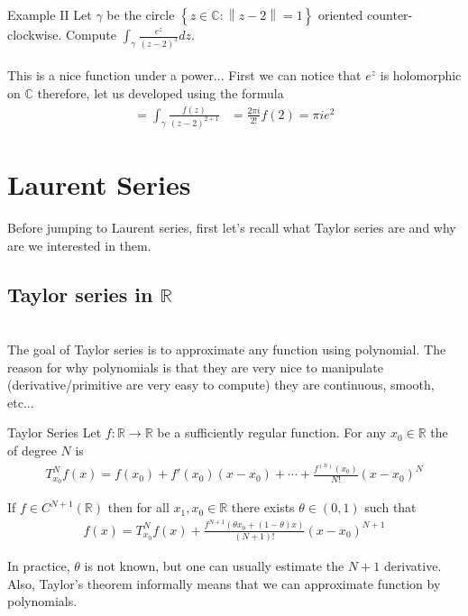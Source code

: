 \begin{parag}{Example II}
    Let $\gamma$ be the circle $\left\{z \in \mathbb{C}: \left\|z - 2\right\|= 1\right\}$ oriented counter-clockwise. Compute $\int_{\gamma}\frac{e^{z}}{\left(z - 2\right)^{3}}dz$.\\
	$ $\\
	This is a nice function under a power... First we can notice that $e^{z}$ is holomorphic on $\mathbb{C}$ therefore, let us developed using the formula
	\begin{align*} 
		=  \int_{\gamma} \frac{f\left(z\right)}{\left(z - 2\right)^{2 + 1}} &= \frac{2\pi i}{2!}f\left(2\right) =  \pi i e^{2}
	\end{align*}
\end{parag}

\chapter{Laurent Series}

Before jumping to Laurent series, first let's recall what Taylor series are and why are we interested in them.

\section{Taylor series in $ \mathbb{R}$}
$ $\\
The goal of Taylor series is to approximate any function using polynomial. The reason for why polynomials is that they are very nice to manipulate (derivative/primitive are very easy to compute) they are continuous, smooth, etc...
\begin{definition}{Taylor Series}
Let $f : \mathbb{R} \to \mathbb{R}$ be a sufficiently regular function. For any $x_0 \in \mathbb{R}$ the  of degree $N$ is 
\begin{align*} 
	T_{x_0}^{N}f\left(x\right) =  f\left(x_0\right) + f'\left(x_0\right)\left(x -  x_0\right) + \cdots + \frac{f^{\left(n\right)}\left(x_0\right)}{N!}\left(x - x_0\right)^{N}
\end{align*}
\end{definition}


\begin{theoreme}
If $f \in C^{N + 1}\left( \mathbb{R}\right)$ then for all $x_1, x_0 \in \mathbb{R}$ there exists $\theta \in \left(0, 1\right)$ such that
\begin{align*}  f\left(x\right) =  T_{x_0}^{N}f\left(x\right) + \frac{f^{N + 1}\left(\theta x_0 + \left(1 - \theta\right)x\right)}{\left(N + 1\right)!}\left(x - x_0\right)^{N + 1}\end{align*}
\end{theoreme}
In practice, $\theta$ is not known, but one can usually estimate the $N + 1$ derivative. Also, Taylor's theorem informally means that we can approximate function by polynomials.\\
$ $\\

